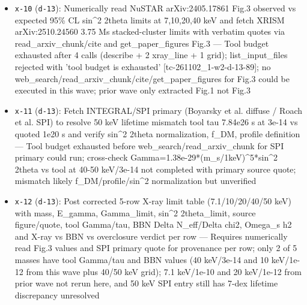 \documentclass[11pt,a4paper]{article}
\begin{document}
\begin{itemize}
  \item \texttt{x-10} (\texttt{d-13}): Numerically read NuSTAR arXiv:2405.17861 Fig.3 observed vs expected 95\% CL sin\textasciicircum{}2 2theta limits at 7,10,20,40 keV and fetch XRISM arXiv:2510.24560 3.75 Ms stacked-cluster limits with verbatim quotes via read\_arxiv\_chunk/cite and get\_paper\_figures Fig.3 --- Tool budget exhausted after 4 calls (describe + 2 xray\_line + 1 grid); list\_input\_files rejected with 'tool budget is exhausted' [tc-261102\_1-w2-d-13-89]; no web\_search/read\_arxiv\_chunk/cite/get\_paper\_figures for Fig.3 could be executed in this wave; prior wave only extracted Fig.1 not Fig.3
  \item \texttt{x-11} (\texttt{d-13}): Fetch INTEGRAL/SPI primary (Boyarsky et al. diffuse / Roach et al. SPI) to resolve 50 keV lifetime mismatch tool tau 7.84e26 s at 3e-14 vs quoted 1e20 s and verify sin\textasciicircum{}2 2theta normalization, f\_DM, profile definition --- Tool budget exhausted before web\_search/read\_arxiv\_chunk for SPI primary could run; cross-check Gamma=1.38e-29*(m\_s/1keV)\textasciicircum{}5*sin\textasciicircum{}2 2theta vs tool at 40-50 keV/3e-14 not completed with primary source quote; mismatch likely f\_DM/profile/sin\textasciicircum{}2 normalization but unverified
  \item \texttt{x-12} (\texttt{d-13}): Post corrected 5-row X-ray limit table (7.1/10/20/40/50 keV) with mass, E\_gamma, Gamma\_limit, sin\textasciicircum{}2 2theta\_limit, source figure/quote, tool Gamma/tau, BBN Delta N\_eff/Delta chi2, Omega\_s h2 and X-ray vs BBN vs overclosure verdict per row --- Requires numerically read Fig.3 values and SPI primary quote for provenance per row; only 2 of 5 masses have tool Gamma/tau and BBN values (40 keV/3e-14 and 10 keV/1e-12 from this wave plus 40/50 keV grid); 7.1 keV/1e-10 and 20 keV/1e-12 from prior wave not rerun here, and 50 keV SPI entry still has 7-dex lifetime discrepancy unresolved
\end{itemize}
\end{document}
